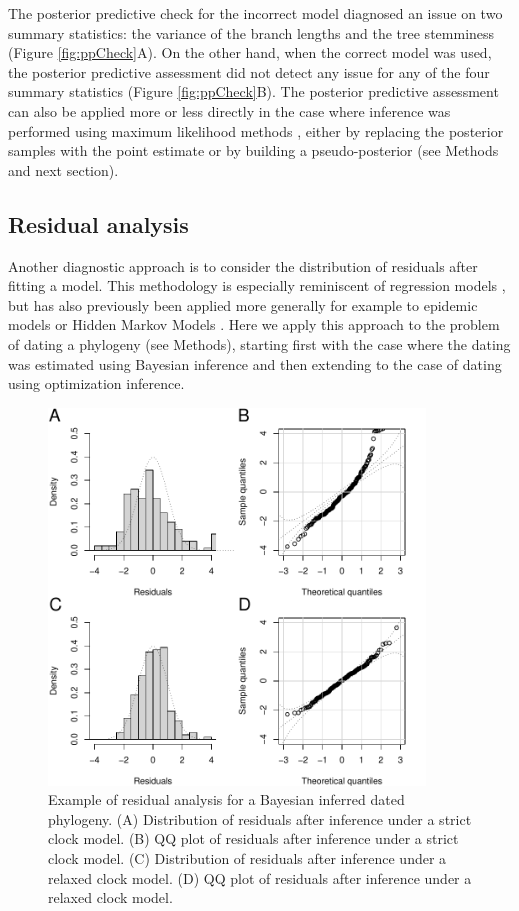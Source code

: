 \documentclass{article}
\begin{document}
The posterior predictive check for the incorrect model diagnosed an issue on
two summary statistics: the variance of the branch lengths and the tree 
stemminess (Figure \ref{fig:ppCheck}A). On the other hand, when the correct model was
used, the posterior predictive assessment did not detect any issue for any of the four
summary statistics (Figure \ref{fig:ppCheck}B). 
The posterior predictive assessment can also be applied more or less directly in the 
case where inference was performed using maximum likelihood methods
\citep{tsayModelCheckingParametric1992,Gelman1996,gelmanDiagnosticChecksDiscrete2000,leePoorPersonsPosterior2016},
either by replacing the posterior samples with the point estimate or by building a
pseudo-posterior (see Methods and next section). 

\subsection*{Residual analysis}

Another diagnostic approach is to consider the distribution of residuals after fitting a model.
This methodology is especially reminiscent of regression models
\citep{coxGeneralDefinitionResiduals1968,dunnRandomizedQuantileResiduals1996},
but has also previously been applied more generally for example to
epidemic models \citep{lauNewModelDiagnostics2014} or 
Hidden Markov Models \citep{zucchini2009hidden,buckbyModelCheckingHidden2020}.
Here we apply this approach to the problem of dating a phylogeny (see Methods), starting first with the case
where the dating was estimated using Bayesian inference and then extending to the case of 
dating using optimization inference. 

\begin{figure}[p!]
\begin{center}
\includegraphics[width=10cm]{exampleResid.pdf}
\end{center}
\caption{Example of residual analysis for a Bayesian inferred dated phylogeny.
(A) Distribution of residuals after inference under a strict clock model. 
(B) QQ plot of residuals after inference under a strict clock model.
(C) Distribution of residuals after inference under a relaxed clock model. 
(D) QQ plot of residuals after inference under a relaxed clock model.
\label{fig:exampleResid}}
\end{figure}
\end{document}
